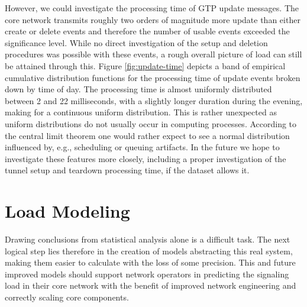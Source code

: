 However, we could investigate the processing time of \ac{GTP} update messages. The core network transmits roughly two orders of magnitude more update than either create or delete events and therefore the number of usable events exceeded the significance level. While no direct investigation of the setup and deletion procedures was possible with these events, a rough overall picture of load can still be attained through this. Figure \ref{fig:update-time} depicts a band of empirical cumulative distribution functions for the processing time of update events broken down by time of day. The processing time is almost uniformly distributed between 2 and 22 milliseconds, with a slightly longer duration during the evening, making for a continuous uniform distribution. This is rather unexpected as uniform distributions do not usually occur in computing processes. According to the central limit theorem one would rather expect to see a normal distribution influenced by, e.g., scheduling or queuing artifacts. In the future we hope to investigate these features more closely, including a proper investigation of the tunnel setup and teardown processing time, if the dataset allows it.



%
%




\section{Load Modeling}
\label{sec:modeling-IMC}

Drawing conclusions from statistical analysis alone is a difficult task. The next logical step lies therefore in the creation of models abstracting this real system, making them easier to calculate with the loss of some precision. This and future improved models should support network operators in predicting the signaling load in their core network with the benefit of improved network engineering and correctly scaling core components.


